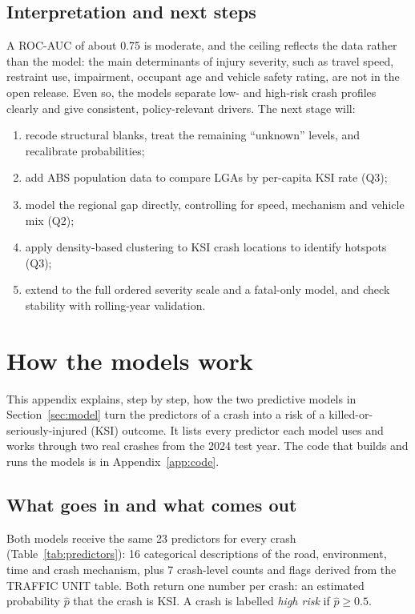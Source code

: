 \documentclass[11pt,a4paper]{article}
\begin{document}
\subsection{Interpretation and next steps}
A ROC-AUC of about 0.75 is moderate, and the ceiling reflects the data rather than the model: the main
determinants of injury severity, such as travel speed, restraint use, impairment, occupant age and vehicle
safety rating, are not in the open release. Even so, the models separate low- and high-risk crash profiles
clearly and give consistent, policy-relevant drivers. The next stage will:
\begin{enumerate}
  \item recode structural blanks, treat the remaining \enquote{unknown} levels, and recalibrate probabilities;
  \item add ABS population data to compare LGAs by per-capita KSI rate (Q3);
  \item model the regional gap directly, controlling for speed, mechanism and vehicle mix (Q2);
  \item apply density-based clustering to KSI crash locations to identify hotspots (Q3);
  \item extend to the full ordered severity scale and a fatal-only model, and check stability with rolling-year validation.
\end{enumerate}

\newpage
\printbibliography[heading=bibintoc,title={References}]

\newpage
\appendix
\section{How the models work}
\label{app:models}

This appendix explains, step by step, how the two predictive models in Section~\ref{sec:model} turn the predictors
of a crash into a risk of a killed-or-seriously-injured (KSI) outcome. It lists every predictor each model uses and
works through two real crashes from the 2024 test year. The code that builds and runs the models is in
Appendix~\ref{app:code}.

\subsection{What goes in and what comes out}
Both models receive the same 23 predictors for every crash (Table~\ref{tab:predictors}): 16 categorical
descriptions of the road, environment, time and crash mechanism, plus 7 crash-level counts and flags derived
from the TRAFFIC UNIT table. Both return one number per crash: an estimated probability $\hat{p}$ that the crash is
KSI. A crash is labelled \emph{high risk} if $\hat{p} \geq 0.5$.
\end{document}
